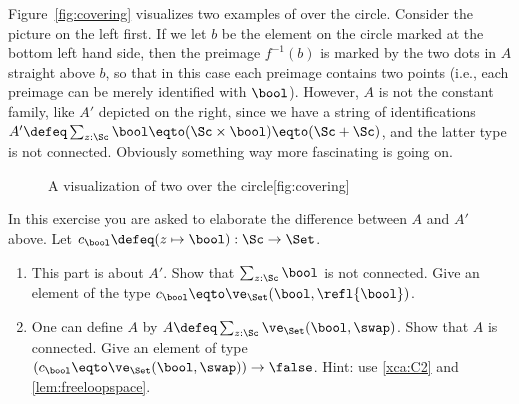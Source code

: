 Figure~\ref{fig:covering} visualizes two examples of \coverings over the circle.
Consider the picture on the left first.
If we let $b$ be the element on the circle marked at the bottom left hand side,
then the preimage $f^{-1}(b)$ is marked by the two dots
in $A$ straight above $b$, so that in this case each preimage contains
two points (i.e., each preimage can be merely identified with $\bool$).
However, $A$ is not the constant family, like $A'$ depicted on the right,
since we have a string of identifications
$A'\defeq\sum_{z:\Sc}\bool\eqto(\Sc\times\bool)\eqto(\Sc+\Sc)$,
and the latter type is not connected.
Obviously something way more fascinating is going on.

\begin{figure}[hbt]
  \begin{sidecaption}%
    {A visualization of two \coverings over the circle}[fig:covering]
  \centering
  \end{sidecaption}
\end{figure}

\begin{xca}\label{xca:twoS1coverings}
In this exercise you are asked to elaborate the difference
between $A$ and $A'$ above.
Let $c_\bool \defeq (z\mapsto\bool): \Sc\to\Set$.
\begin{enumerate}
\item
This part is about $A'$. Show that $\sum_{z:\Sc}\bool$ is not connected.
Give an element of the type $c_\bool\eqto\ve_\Set(\bool,\refl{\bool})$.
\item
One can define $A$ by $A\defeq\sum_{z:\Sc}\ve_\Set(\bool,\swap)$.
Show that $A$ is connected.
Give an element of type $(c_\bool\eqto\ve_\Set(\bool,\swap))\to\false$.
Hint: use \cref{xca:C2} and \cref{lem:freeloopspace}.\qedhere
\end{enumerate}
\end{xca}

